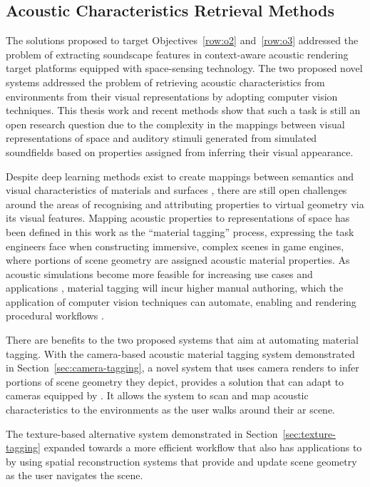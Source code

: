 \subsection{Acoustic Characteristics Retrieval Methods}
The solutions proposed to target Objectives~\ref{row:o2} and~\ref{row:o3} addressed the problem of extracting soundscape features in context-aware acoustic rendering target platforms equipped with space-sensing technology. The two proposed novel systems addressed the problem of retrieving acoustic characteristics from environments from their visual representations by adopting computer vision techniques. This thesis work and recent methods show that such a task is still an open research question due to the complexity in the mappings between visual representations of space and auditory stimuli generated from simulated soundfields based on properties assigned from inferring their visual appearance.\par
Despite deep learning methods exist to create mappings between semantics and visual characteristics of materials and surfaces \citep{gaur2019superpixel,chen2022visual}, there are still open challenges around the areas of recognising and attributing properties to virtual geometry via its visual features.
Mapping acoustic properties to representations of space has been defined in this work as the ``material tagging'' process, expressing the task engineers face when constructing immersive, complex scenes in game engines, where portions of scene geometry are assigned acoustic material properties. As acoustic simulations become more feasible for increasing use cases and applications \citep{liu2020sound}, material tagging will incur higher manual authoring, which the application of computer vision techniques can automate, enabling and rendering procedural workflows \citep{schissler2017acoustic}.\par
There are benefits to the two proposed systems that aim at automating material tagging. With the camera-based acoustic material tagging system demonstrated in Section~\ref{sec:camera-tagging}, a novel system that uses camera renders to infer portions of scene geometry they depict, provides a solution that can adapt to cameras equipped by . It allows the system to scan and map acoustic characteristics to the environments as the user walks around their \acrshort{ar} scene.\par
The texture-based alternative system demonstrated in Section~\ref{sec:texture-tagging} expanded towards a more efficient workflow that also has applications to  by using spatial reconstruction systems that provide and update scene geometry as the user navigates the scene.

